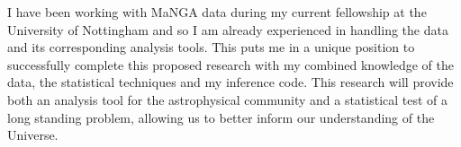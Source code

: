 \documentclass[11pt]{article}
\begin{document}
I have been working with MaNGA data during my current fellowship at the University of Nottingham and so I am already experienced in handling the data and its corresponding analysis tools. This puts me in a unique position to successfully complete this proposed research with my combined knowledge of the data, the statistical techniques and my inference code. This research will provide both an analysis tool for the astrophysical community and a statistical test of a long standing 	problem, allowing us to better inform our understanding of the Universe.




\vspace{-0.5em}
\end{document}
